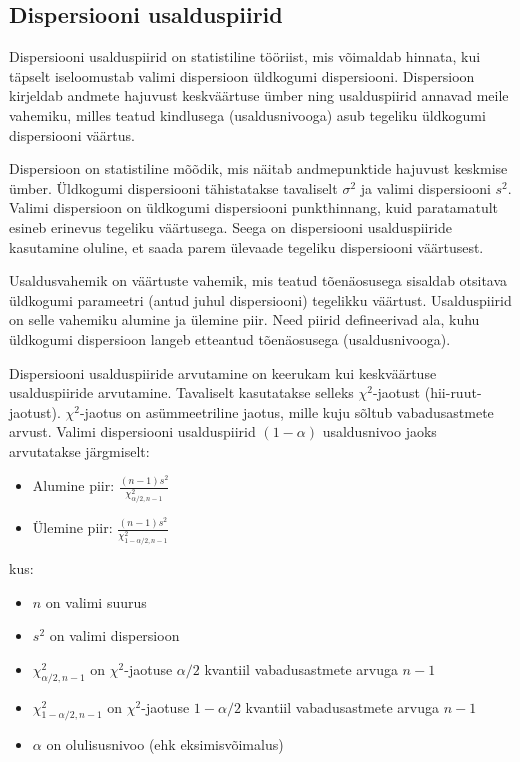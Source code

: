 \documentclass[
]{book}
\providecommand{\tightlist}{%
  \setlength{\itemsep}{0pt}\setlength{\parskip}{0pt}}
\theoremstyle{definition}
\theoremstyle{definition}
\theoremstyle{definition}
\theoremstyle{definition}
\theoremstyle{remark}
\begin{document}
\subsection{Dispersiooni usalduspiirid}\label{dispersiooni-usalduspiirid}

Dispersiooni usalduspiirid on statistiline tööriist, mis võimaldab hinnata, kui täpselt iseloomustab valimi dispersioon üldkogumi dispersiooni. Dispersioon kirjeldab andmete hajuvust keskväärtuse ümber ning usalduspiirid annavad meile vahemiku, milles teatud kindlusega (usaldusnivooga) asub tegeliku üldkogumi dispersiooni väärtus.

Dispersioon on statistiline mõõdik, mis näitab andmepunktide hajuvust keskmise ümber. Üldkogumi dispersiooni tähistatakse tavaliselt \(\sigma^2\) ja valimi dispersiooni \(s^2\). Valimi dispersioon on üldkogumi dispersiooni punkthinnang, kuid paratamatult esineb erinevus tegeliku väärtusega. Seega on dispersiooni usalduspiiride kasutamine oluline, et saada parem ülevaade tegeliku dispersiooni väärtusest.

Usaldusvahemik on väärtuste vahemik, mis teatud tõenäosusega sisaldab otsitava üldkogumi parameetri (antud juhul dispersiooni) tegelikku väärtust. Usalduspiirid on selle vahemiku alumine ja ülemine piir. Need piirid defineerivad ala, kuhu üldkogumi dispersioon langeb etteantud tõenäosusega (usaldusnivooga).

Dispersiooni usalduspiiride arvutamine on keerukam kui keskväärtuse usalduspiiride arvutamine. Tavaliselt kasutatakse selleks \(\chi^2\)-jaotust (hii-ruut-jaotust). \(\chi^2\)-jaotus on asümmeetriline jaotus, mille kuju sõltub vabadusastmete arvust. Valimi dispersiooni usalduspiirid \((1-\alpha)\) usaldusnivoo jaoks arvutatakse järgmiselt:

\begin{itemize}
\tightlist
\item
  Alumine piir: \(\frac{(n-1)s^2}{\chi^2_{\alpha/2, n-1}}\)
\item
  Ülemine piir: \(\frac{(n-1)s^2}{\chi^2_{1-\alpha/2, n-1}}\)
\end{itemize}

kus:

\begin{itemize}
\tightlist
\item
  \(n\) on valimi suurus
\item
  \(s^2\) on valimi dispersioon
\item
  \(\chi^2_{\alpha/2, n-1}\) on \(\chi^2\)-jaotuse \(\alpha/2\) kvantiil vabadusastmete arvuga \(n-1\)
\item
  \(\chi^2_{1-\alpha/2, n-1}\) on \(\chi^2\)-jaotuse \(1-\alpha/2\) kvantiil vabadusastmete arvuga \(n-1\)
\item
  \(\alpha\) on olulisusnivoo (ehk eksimisvõimalus)
\end{itemize}
\end{document}
